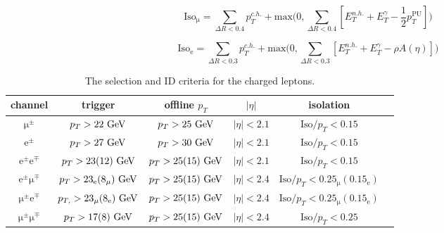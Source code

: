 \begin{equation}
\label{eq:iso_mu}
\mathrm{Iso}_{\mathrm{\mu}} = \sum_{\Delta R < 0.4} p_T^{c.h.} + \mathrm{max}\biggl(0, \sum_{\Delta R < 0.4} [E_T^{n.h.} + E_T^{\gamma} - \frac{1}{2} p_T^{\mathrm{PU}}] \biggr)
\end{equation}

\begin{equation}
\label{eq:iso_el}
\mathrm{Iso}_{\mathrm{e}} = \sum_{\Delta R < 0.3} p_T^{c.h.} + \mathrm{max}\biggl(0, \sum_{\Delta R < 0.3} [E_T^{n.h.} + E_T^{\gamma} - \rho A(\eta)] \biggr)
\end{equation}

\begin{table}[h!]
\begin{center}
\caption{The selection and ID criteria for the charged leptons.}
\label{tab:lepton_selection}
\begin{tabular}{c|ccccc}
\hline
channel & trigger & offline $p_T$ & $|\eta|$ & isolation \\
\hline
$\mathrm{\mu}^\pm$ & $p_T > 22~\mathrm{GeV}$ & $p_T > 25~\mathrm{GeV}$ & $|\eta| < 2.1$ &  $\mathrm{Iso}/p_T < 0.15$ \\

$\mathrm{e}^\pm$ & $p_T > 27~\mathrm{GeV}$ & $p_T > 30~\mathrm{GeV}$ & $|\eta| < 2.1$ & $\mathrm{Iso}/p_T < 0.15$\\

$\mathrm{e}^\pm\mathrm{e}^\mp$ & $p_T > 23 (12)~\mathrm{GeV}$ & $p_T > 25 (15)~\mathrm{GeV}$ & $|\eta| < 2.1$ & $\mathrm{Iso}/p_T < 0.15$\\

$\mathrm{e}^\pm\mathrm{\mu}^\mp$ & $p_{T} > 23_{\mathrm{e}} (8_{\mathrm{\mu}})~\mathrm{GeV}$ & $p_T > 25 (15)~\mathrm{GeV}$ & $|\eta| < 2.4$ & $\mathrm{Iso}/p_T < 0.25_{\mathrm{\mu}} (0.15_{\mathrm{e}})$ \\

$\mathrm{\mu}^\pm\mathrm{e}^\mp$ & $p_{T,} > 23_{\mathrm{\mu}} (8_{\mathrm{e}})~\mathrm{GeV}$ & $p_T > 25 (15)~\mathrm{GeV}$ & $|\eta| < 2.4$ & $\mathrm{Iso}/p_T < 0.25_{\mathrm{\mu}} (0.15_{\mathrm{e}})$ \\

$\mathrm{\mu}^\pm\mathrm{\mu}^\mp$ & $p_T > 17 (8)~\mathrm{GeV}$ & $p_T > 25 (15)~\mathrm{GeV}$ & $|\eta| < 2.4$ & $\mathrm{Iso}/p_T < 0.25$ \\

\hline
\hline
\end{tabular}
\end{center}
\end{table}

